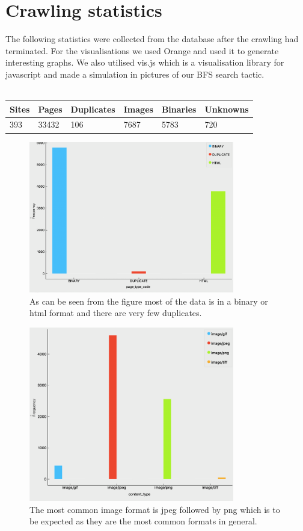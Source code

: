 \documentclass[runningheads]{llncs}
\begin{document}
\section{Crawling statistics}
The following statistics were collected from the database after the crawling had terminated. For the visualisations we used Orange and used it to generate interesting graphs. We also utilised vis.js which is a visualisation library for javascript and made a simulation in pictures of our BFS search tactic.
\\
\\
{
\begin{tabular}{|p{2.5cm}|p{2.5cm}|p{2.5cm}|p{2.5cm}|p{2.5cm}|p{2.5cm}|}
\hline
Sites & Pages & Duplicates & Images & Binaries & Unknowns \\
\hline
393 & 33432 & 106 & 7687 & 5783 & 720  \\
\hline
\end{tabular}
}
\begin{figure}[H]
  \centering
  \includegraphics[width=0.8\textwidth]{html_duplicate_binary.png}
  \caption{As can be seen from the figure most of the data is in a binary or html format and there are very few duplicates.}
\end{figure}
\begin{figure}[H]
  \centering
  \includegraphics[width=0.8\textwidth]{img_stats.png}
  \caption{The most common image format is jpeg followed by png which is to be expected as they are the most common formats in general.}
\end{figure}
\end{document}
